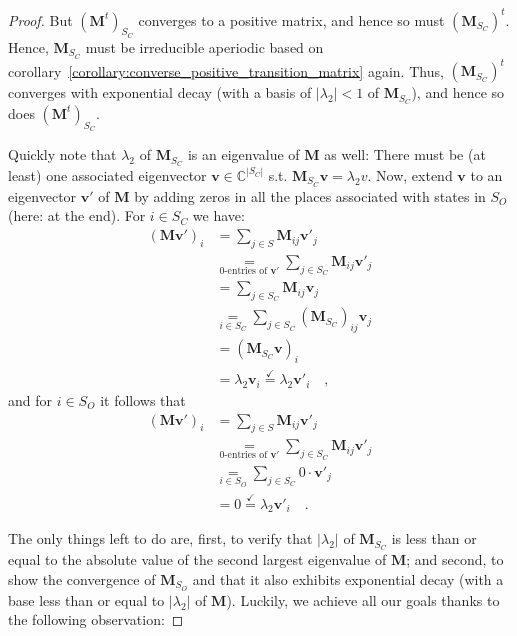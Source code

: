 \documentclass[../../main.tex]{subfiles}
\begin{document}
\begin{proof}
        But $(\bm{M}^t)_{S_C}$ converges to a positive matrix, and hence so must $(\bm{M}_{S_C})^t$. Hence, $\bm{M}_{S_C}$ must be irreducible aperiodic based on corollary~\ref{corollary:converse_positive_transition_matrix} again. Thus, $(\bm{M}_{S_C})^t$ converges with exponential decay (with a basis of $|\lambda_2| < 1$ of $\bm{M}_{S_C}$), and hence so does $(\bm{M}^t)_{S_C}$.

        Quickly note that $\lambda_2$ of $\bm{M}_{S_C}$ is an eigenvalue of $\bm{M}$ as well: There must be (at least) one associated eigenvector $\bm{v} \in \mathbb{C}^{|S_C|}$ s.t. $\bm{M}_{S_C} \bm{v} = \lambda_2 v$. Now, extend $\bm{v}$ to an eigenvector $\bm{v}'$ of $\bm{M}$ by adding zeros in all the places associated with states in $S_O$ (here: at the end). For $i \in S_C$ we have:
        \begin{align*}
            (\bm{M} \bm{v}')_i &= \sum_{j \in S} \bm{M}_{ij} \bm{v}'_j \\
            &\underset{\text{0-entries of $\bm{v}'$}}{=} \sum_{j \in S_C} \bm{M}_{ij} \bm{v}'_j \\
            &= \sum_{j \in S_C} \bm{M}_{ij} \bm{v}_j \\
            &\underset{i \in S_C}{=} \sum_{j \in S_C} (\bm{M}_{S_C})_{ij} \bm{v}_j \\
            &= (\bm{M}_{S_C} \bm{v})_i \\
            &= \lambda_2 \bm{v}_i \overset{\checkmark}{=} \lambda_2 \bm{v}'_i \quad ,
        \end{align*}
        and for $i \in S_O$ it follows that
        \begin{align*}
            (\bm{M} \bm{v}')_i &= \sum_{j \in S} \bm{M}_{ij} \bm{v}'_j \\
            &\underset{\text{0-entries of $\bm{v}'$}}{=} \sum_{j \in S_C} \bm{M}_{ij} \bm{v}'_j \\
            &\underset{i \in S_O}{=} \sum_{j \in S_C} 0 \cdot \bm{v}'_j \\
            &= 0 \overset{\checkmark}{=} \lambda_2 \bm{v}'_i \quad .
        \end{align*}

        The only things left to do are, first, to verify that $|\lambda_2|$ of $\bm{M}_{S_C}$ is less than or equal to the absolute value of the second largest eigenvalue of $\bm{M}$; and second, to show the convergence of $\bm{M}_{S_O}$ and that it also exhibits exponential decay (with a base less than or equal to $|\lambda_2|$ of $\bm{M}$). Luckily, we achieve all our goals thanks to the following observation:


\end{proof}
\end{document}
